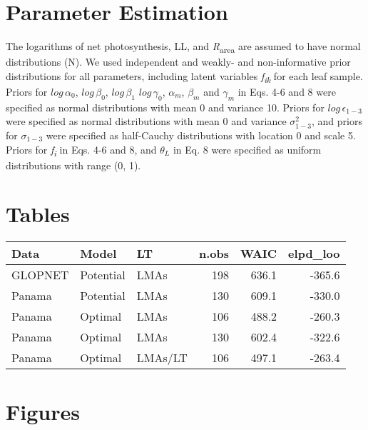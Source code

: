 \documentclass[12pt,]{article}
\title{}
\author{}
\date{}
\begin{document}
\hypertarget{parameter-estimation}{%
\section{Parameter Estimation}\label{parameter-estimation}}

The logarithms of net photosynthesis, LL, and
\emph{R}\textsubscript{area} are assumed to have normal distributions
(N). We used independent and weakly- and non-informative prior
distributions for all parameters, including latent variables
\emph{f\textsubscript{ik}} for each leaf sample. Priors for
\(log\,\alpha_0\), \(log\,\beta_0\), \(log\,\beta_1\) \(log\,\gamma_0\),
\(\alpha_m\), \(\beta_m\) and \(\gamma_m\) in Eqs. 4-6 and 8 were
specified as normal distributions with mean 0 and variance 10. Priors
for \(log\,\epsilon_{1-3}\) were specified as normal distributions with
mean 0 and variance \(\sigma^2_{1-3}\), and priors for \(\sigma_{1-3}\)
were specified as half-Cauchy distributions with location 0 and scale 5.
Priors for \emph{f\textsubscript{i}} in Eqs. 4-6 and 8, and \(\theta_L\)
in Eq. 8 were specified as uniform distributions with range (0, 1).

\newpage

\hypertarget{tables}{%
\section{Tables}\label{tables}}

\begin{tabular}{l|l|l|r|r|r}
\hline
Data & Model & LT & n.obs & WAIC & elpd\_loo\\
\hline
GLOPNET & Potential & LMAs & 198 & 636.1 & -365.6\\
\hline
Panama & Potential & LMAs & 130 & 609.1 & -330.0\\
\hline
Panama & Optimal & LMAs & 106 & 488.2 & -260.3\\
\hline
Panama & Optimal & LMAs & 130 & 602.4 & -322.6\\
\hline
Panama & Optimal & LMAs/LT & 106 & 497.1 & -263.4\\
\hline
\end{tabular}

\hypertarget{figures}{%
\section{Figures}\label{figures}}
\end{document}
